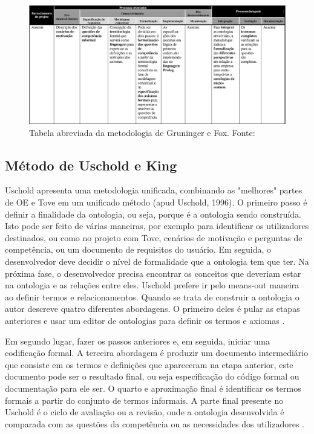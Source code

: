 \begin{figure}[h] 
\centering
\includegraphics[scale=0.3]{Figuras/4.png}
\caption[Tabela abreviada da metodologia de Gruninger e Fox]{Tabela abreviada da metodologia de Gruninger e Fox. Fonte: \cite{DanielaLucas2008}}
\end{figure}
 
\subsection{Método de Uschold e King} 
 Uschold apresenta uma metodologia unificada, combinando as "melhores" partes de OE e Tove em um unificado
 método (apud Uschold, 1996). O primeiro passo é definir a finalidade da ontologia, ou seja, porque é a ontologia sendo
 construída. Isto pode ser feito de várias maneiras, por exemplo para identificar os utilizadores destinados, ou como no
 projeto com Tove, cenários de motivação e perguntas de competência, ou um documento de requisitos do usuário. Em seguida,
 o desenvolvedor deve decidir o nível de formalidade que a ontologia tem que ter. Na próxima fase, o desenvolvedor precisa
 encontrar os conceitos que deveriam estar na ontologia e as relações entre eles. Uschold prefere ir pelo means-out maneira
 ao definir termos e relacionamentos. Quando se trata de construir a ontologia o autor descreve quatro diferentes abordagens.
 O primeiro deles é pular as etapas anteriores e usar um editor de ontologias para definir
 os termos e axiomas \cite{SeveralAuthorUFF2011}.

Em segundo lugar, fazer os passos anteriores e, em seguida, iniciar uma codificação formal. A terceira abordagem é produzir
um documento intermediário que consiste em os termos e definições que apareceram na etapa anterior, este documento pode ser
o resultado final, ou seja especificação do código formal ou documentação para ele ser. O quarto e aproximação final é
identificar os termos formais a partir do conjunto de termos informais. A parte final presente no Uschold é o ciclo de
avaliação ou a revisão, onde a ontologia desenvolvida é comparada com as questões da competência ou as necessidades
dos utilizadores \cite{SeveralAuthor2011}.

